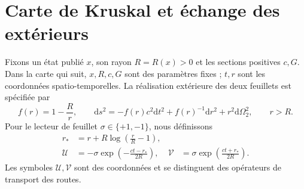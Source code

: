 \section{Carte de Kruskal et échange des extérieurs}
\label{x_reciprocidad:vii:subsec:kruskal-dos-hojas}

Fixons un état publié \(x\), son rayon \(R=R(x)>0\) et les
sections positives \(c,G\). Dans la carte qui suit, \(x,R,c,G\)
sont des paramètres fixes ; \(t,r\) sont les coordonnées spatio-temporelles.
La réalisation extérieure des deux feuillets est spécifiée par
\begin{equation}
 f(r)=1-\frac Rr,\qquad
 \mathrm ds^2=-f(r)c^2\mathrm dt^2+f(r)^{-1}\mathrm dr^2
                 +r^2\mathrm d\Omega_2^2,\qquad r>R.
 \label{x_reciprocidad:vii:eq:metrica-exterior}
\end{equation}
Pour le lecteur de feuillet \(\sigma\in\{+1,-1\}\), nous définissons
\begin{align}
 r_*&=r+R\log\left(\frac rR-1\right),\\
 \mathcal U&=-\sigma\exp\left(-\frac{ct-r_*}{2R}\right),&
 \mathcal V&=\sigma\exp\left(\frac{ct+r_*}{2R}\right).
 \label{x_reciprocidad:vii:eq:carta-kruskal}
\end{align}
Les symboles \(\mathcal U,\mathcal V\) sont des coordonnées et se
distinguent des opérateurs de transport des routes.

